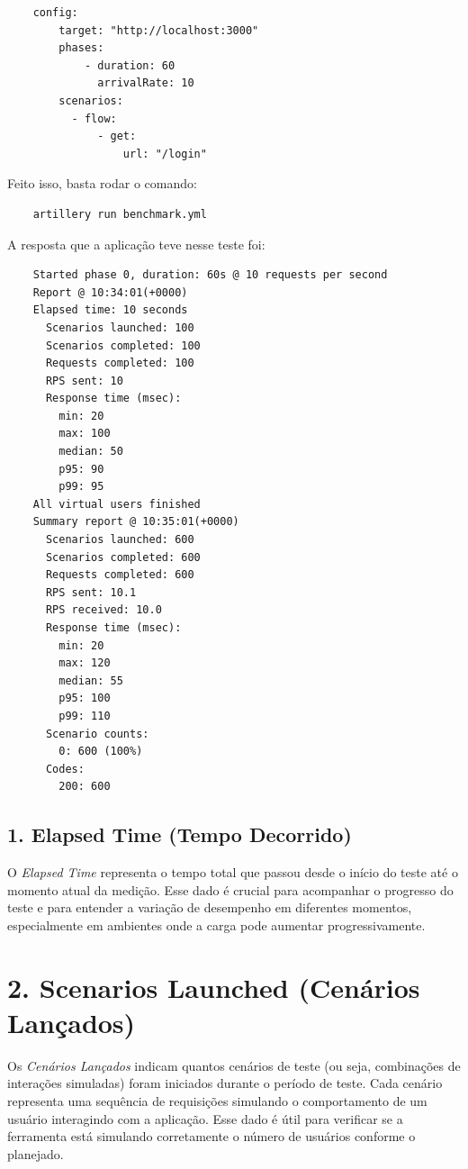 \begin{verbatim}
    config:
        target: "http://localhost:3000"
        phases:
            - duration: 60
              arrivalRate: 10
        scenarios:
          - flow:
              - get:
                  url: "/login"
\end{verbatim}

Feito isso, basta rodar o comando:

\begin{verbatim}
    artillery run benchmark.yml
\end{verbatim}

A resposta que a aplicação teve nesse teste foi:

\begin{verbatim}
    Started phase 0, duration: 60s @ 10 requests per second
    Report @ 10:34:01(+0000)
    Elapsed time: 10 seconds
      Scenarios launched: 100
      Scenarios completed: 100
      Requests completed: 100
      RPS sent: 10
      Response time (msec):
        min: 20
        max: 100
        median: 50
        p95: 90
        p99: 95
    All virtual users finished
    Summary report @ 10:35:01(+0000)
      Scenarios launched: 600
      Scenarios completed: 600
      Requests completed: 600
      RPS sent: 10.1
      RPS received: 10.0
      Response time (msec):
        min: 20
        max: 120
        median: 55
        p95: 100
        p99: 110
      Scenario counts:
        0: 600 (100%)
      Codes:
        200: 600
\end{verbatim}

\subsection{1. Elapsed Time (Tempo Decorrido)}

O \textit{Elapsed Time} representa o tempo total que passou desde o início do teste até o momento atual da medição. Esse dado é crucial para acompanhar o progresso do teste e para entender a variação de desempenho em diferentes momentos, especialmente em ambientes onde a carga pode aumentar progressivamente.

\section*{2. Scenarios Launched (Cenários Lançados)}

Os \textit{Cenários Lançados} indicam quantos cenários de teste (ou seja, combinações de interações simuladas) foram iniciados durante o período de teste. Cada cenário representa uma sequência de requisições simulando o comportamento de um usuário interagindo com a aplicação. Esse dado é útil para verificar se a ferramenta está simulando corretamente o número de usuários conforme o planejado.

